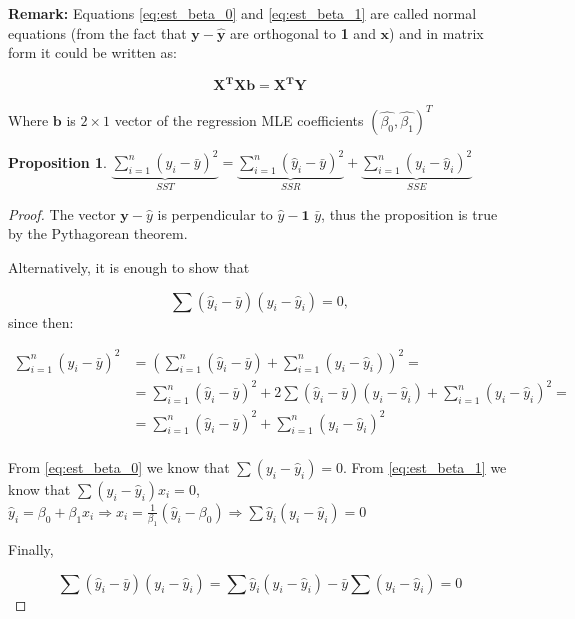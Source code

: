 \documentclass[12pt,a4paper,oneside]{book} %
\newtheorem{proposition}[theorem]{Proposition}
\begin{document}
\textbf{Remark:} Equations \ref{eq:est_beta_0} and \ref{eq:est_beta_1} are called normal equations \cite{neter1983applied} (from the fact that $\mathbf{y-\hat{y}}$ are orthogonal to \textbf{1} and $\mathbf{x}$) and in matrix form it could be written as:

\begin{equation} \label{eq:matrix_form_ols}
	\mathbf{X^TXb = X^TY}
\end{equation}

Where $\mathbf{b}$ is $2 \times 1 $ vector of the regression MLE coefficients $(\hat{\beta_0}, \hat{\beta_1})^T$ 


\begin{proposition} \label{prop:sst_equation}
	$\underbrace{\sum_{i=1}^{n} (y_i - \bar{y})^2}_{SST} = \underbrace{\sum_{i=1}^{n} (\hat{y}_i - \bar{y})^2}_{SSR} + \underbrace{\sum_{i=1}^{n} (y_i - \hat{y}_i)^2}_{SSE}$
\end{proposition}


\begin{proof}The vector $\textbf{y} - \textbf{$\hat{y}$}$ is perpendicular to $\textbf{$\hat{y}$} - \textbf{1 $\bar{y}$}$, thus the proposition is true by the Pythagorean theorem.

Alternatively, it is enough to show that

\[
	\sum (\hat{y}_i-\bar{y})(y_i-\hat{y}_i) = 0	,
\] since then:

\begin{align*}
	\sum_{i=1}^{n} (y_i - \bar{y})^2 &= (\sum_{i=1}^{n} (\hat{y}_i - \bar{y}) + \sum_{i=1}^{n} (y_i - \hat{y}_i))^2 = \\
	&= \sum_{i=1}^{n} (\hat{y}_i - \bar{y})^2 + 2\sum (\hat{y}_i-\bar{y})(y_i-\hat{y}_i)+ \sum_{i=1}^{n} (y_i - \hat{y}_i)^2 = \\
	&= \sum_{i=1}^{n} (\hat{y}_i - \bar{y})^2 + \sum_{i=1}^{n} (y_i - \hat{y}_i)^2 \\
\end{align*}

From \ref{eq:est_beta_0} we know that $\sum (y_i-\hat{y}_i)=0$.
From \ref{eq:est_beta_1} we know that $\sum (y_i-\hat{y}_i)x_i=0$,
$\hat{y}_i = \beta_0 + \beta_1 x_i \Rightarrow x_i = \frac{1}{\beta_1}(\hat{y}_i-\beta_0) \Rightarrow \sum \hat{y}_i (y_i-\hat{y}_i)=0$

Finally, 

\[
	\sum (\hat{y}_i-\bar{y})(y_i-\hat{y}_i) = \sum \hat{y}_i(y_i-\hat{y}_i)-\bar{y}\sum (y_i-\hat{y}_i)=0	
\]


\end{proof}
\end{document}
